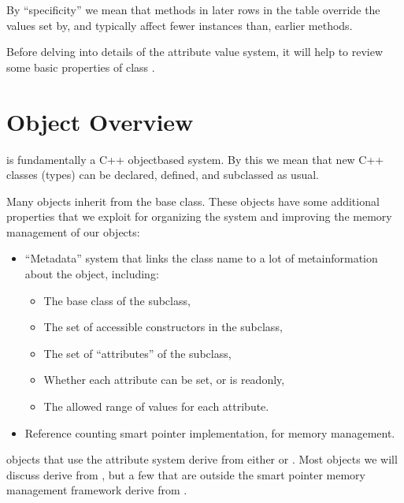 \documentclass[letterpaper,10pt,english]{sphinxmanual}
\renewcommand{\sphinxcode}[1]{\texttt{\small{#1}}}
\begin{document}
By “specificity” we mean that methods in later rows in the table
override the values set by, and typically affect fewer instances than,
earlier methods.

Before delving into details of the attribute value system, it will help to
review some basic properties of class \sphinxcode{}.


\section{Object Overview}
\label{\detokenize{attributes:object-overview}}
 is fundamentally a C++ object\sphinxhyphen{}based system. By this we mean that new C++
classes (types) can be declared, defined, and subclassed as usual.

Many  objects inherit from the \sphinxcode{} base class.  These
objects have some additional properties that we exploit for organizing the
system and improving the memory management of our objects:
\begin{itemize}
\item {} 
“Metadata” system that links the class name to a lot of meta\sphinxhyphen{}information
about the object, including:
\begin{itemize}
\item {} 
The base class of the subclass,

\item {} 
The set of accessible constructors in the subclass,

\item {} 
The set of “attributes” of the subclass,

\item {} 
Whether each attribute can be set, or is read\sphinxhyphen{}only,

\item {} 
The allowed range of values for each attribute.

\end{itemize}

\item {} 
Reference counting smart pointer implementation, for memory management.

\end{itemize}

 objects that use the attribute system derive from either
\sphinxcode{} or \sphinxcode{}. Most  objects we
will discuss derive from \sphinxcode{}, but a few that are outside
the smart pointer memory management framework derive from
\sphinxcode{}.
\end{document}
